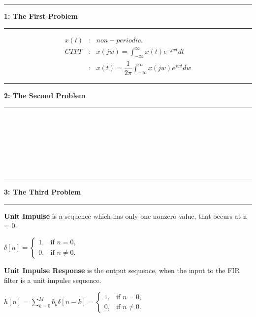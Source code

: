 \documentclass[11pt]{article}
\newcommand\question[2]{\vspace{.25in}\hrule\textbf{#1: #2}\vspace{.5em}\hrule\vspace{.10in}}
\newcommand\tab[1][1cm]{\hspace*{#1}}
\begin{document}
\raggedright
\newcommand\NAME{Kadir Emre Otod}  %
\newcommand\ANDREWID{150140032}     %
\newcommand\HWNUM{2}              %


\question{1}{The First Problem} 

\begin{eqnarray*}
	x(t) & : & non-periodic.  \\
	CTFT & : & x(jw) = \int_{-\infty}^{\infty} x(t) e^{-jwt} dt \\
	& : & x(t) = \dfrac{1}{2\pi} \int_{-\infty}^{\infty} x(jw) e^{jwt} dw
\end{eqnarray*}

\question{2}{The Second Problem} 

\tab \\
\tab \\
\tab \\
\tab \\
\tab \\
\tab \\


\question{3}{The Third Problem} 

\textbf{Unit Impulse} is a sequence which has only one nonzero value, that occurs at n = 0.

\begin{center}
	$\delta[n] =
		\begin{cases}
			1, &         \text{if } n = 0,\\
			0, &         \text{if } n \neq 0.
	\end{cases} $
\end{center}

\textbf{Unit Impulse Response} is the output sequence, when the input to the FIR filter is a unit impulse sequence.

\begin{center}
	$h[n] = \sum_{k=0}^{M}b_k \delta[n-k] = 
	\begin{cases}
	1, &         \text{if } n = 0,\\
	0, &         \text{if } n \neq 0.
	\end{cases}  $
\end{center}
\end{document}

